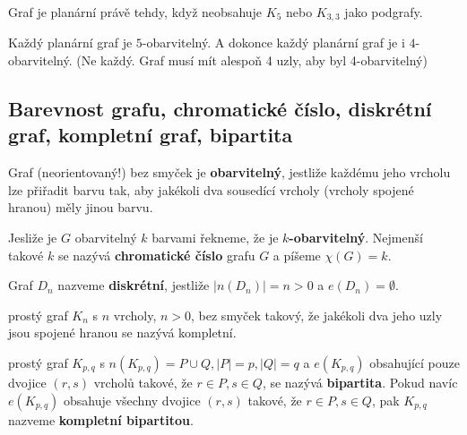 \begin{theorem}
Graf je planární právě tehdy, když neobsahuje $K_5$ nebo $K_{3,3}$ jako podgrafy.
\end{theorem}

\begin{theorem}
Každý planární graf je $5$-obarvitelný. A dokonce každý planární graf je i $4$-obarvitelný. (Ne každý. Graf musí mít alespoň 4 uzly, aby byl 4-obarvitelný)
\end{theorem}

\subsection{Barevnost grafu, chromatické číslo, diskrétní graf, kompletní graf, bipartita}

\begin{definition}
Graf (neorientovaný!) bez smyček je \textbf{obarvitelný}, jestliže každému jeho vrcholu lze přiřadit barvu tak, aby jakékoli dva sousedící vrcholy (vrcholy spojené hranou) měly jinou barvu.
\end{definition}

\begin{definition}
Jesliže je $G$ obarvitelný $k$ barvami řekneme, že je \textbf{$k$-obarvitelný}. Nejmenší takové $k$ se nazývá \textbf{chromatické číslo} grafu $G$ a píšeme $\chi(G) = k$.
\end{definition}

\begin{definition}
Graf $D_n$ nazveme \textbf{diskrétní}, jestliže $|n(D_n)| = n > 0$ a $e(D_n) = \emptyset$. 
\end{definition}

\begin{definition}
prostý graf $K_n$ s $n$ vrcholy, $n >0$, bez smyček takový, že jakékoli dva jeho uzly jsou spojené hranou se nazývá kompletní.
\end{definition}

\begin{definition}
prostý graf $K_{p,q}$ s $n(K_{p,q}) = P \cup Q, |P| = p, |Q| = q$ a $e(K_{p,q})$ obsahující pouze dvojice $(r,s)$ vrcholů takové, že $r \in P, s \in Q$, se nazývá \textbf{bipartita}. Pokud navíc $e(K_{p,q})$ obsahuje všechny dvojice $(r,s)$ takové, že $r \in P, s \in Q$, pak $K_{p,q}$ nazveme \textbf{kompletní bipartitou}.
\end{definition}

